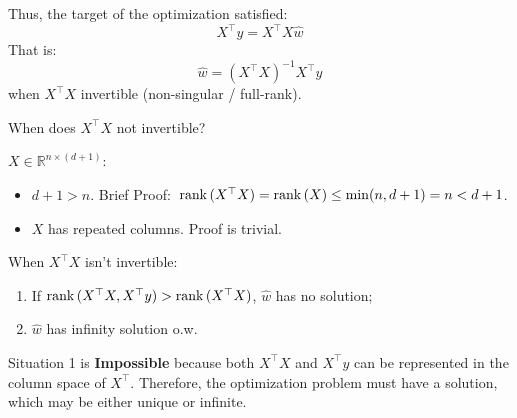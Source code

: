\documentclass[../main]{subfiles}
\begin{document}
Thus, the target of the optimization satisfied:
\begin{equation}
    X^\top y=X^\top X\hat w
\end{equation}
That is:
\begin{equation}
    \hat w=(X^\top X)^{-1}X^\top y
\end{equation}
when $X^\top X$ invertible (non-singular / full-rank).
\begin{example}
  When does $X^\top X$ not invertible?
\end{example}
\begin{solution}
  $X\in \mathbb R^{n\times(d+1)}$:
\begin{itemize}
  \item $d+1>n.$ Brief Proof: $\, {\mathrm{rank}\,} (X^\top X)={\mathrm{rank}\,} (X)\le\min(n,d+1)=n<d+1$.
  \item $X$ has repeated columns. Proof is trivial.
\end{itemize}
\end{solution}

\vspace{1em}
When $X^\top X$ isn't invertible:
\begin{enumerate}
  \item If ${\mathrm{rank}\,} (X^\top X, X^\top y)>{\mathrm{rank}\,} (X^\top X)$, $\hat w$ has no solution; 
  \item $\hat w$ has infinity solution o.w.
\end{enumerate}
Situation 1 is \textbf{Impossible} because both $X^\top X$ and $X^\top y$ can be represented in the column space of $X^\top$. Therefore, the optimization problem must have a solution, which may be either unique or infinite.
\end{document}
